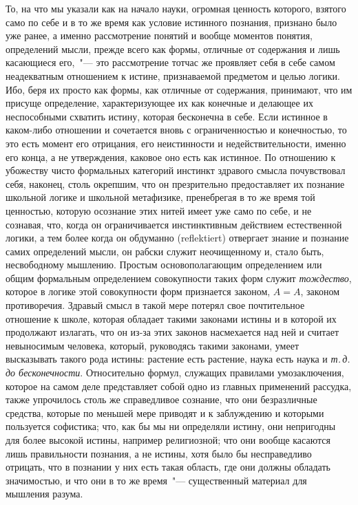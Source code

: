 То, на что мы указали как на начало науки, огромная
ценность которого, взятого само по себе и в то же время
как условие истинного познания, признано было уже ранее,
а именно рассмотрение понятий и вообще моментов
понятия, определений мысли, прежде всего как формы,
отличные от содержания и лишь касающиеся его,~"--- это
рассмотрение тотчас же проявляет себя в себе самом
неадекватным отношением к истине, признаваемой предметом
и целью логики. Ибо, беря их просто как формы,
как отличные от содержания, принимают, что им присуще
определение, характеризующее их как конечные и делающее
их неспособными схватить истину, которая бесконечна
в себе. Если истинное в каком-либо отношении и
сочетается вновь с ограниченностью и конечностью, то
это есть момент его отрицания, его неистинности и недействительности,
именно его конца, а не утверждения, каковое
оно есть как истинное. По отношению к убожеству
чисто формальных категорий инстинкт здравого смысла
почувствовал себя, наконец, столь окрепшим, что он презрительно
предоставляет их познание школьной логике
и школьной метафизике, пренебрегая в то же время той
ценностью, которую осознание этих нитей имеет уже
само по себе, и не сознавая, что, когда он ограничивается
инстинктивным действием естественной логики, а тем
более когда он обдуманно (reflektiert) отвергает знание и
познание самих определений мысли, он рабски служит
неочищенному и, стало быть, несвободному мышлению.
Простым основополагающим определением или общим
формальным определением совокупности таких форм служит
\emph{тождество}, которое в логике этой совокупности форм
признается законом, $A = A$, законом противоречия. Здравый
смысл в такой мере потерял свое почтительное отношение
к школе, которая обладает такими законами истины
и в которой их продолжают излагать, что он из-за
этих законов насмехается над ней и считает невыносимым
человека, который, руководясь такими законами,
умеет высказывать такого рода истины: растение есть
растение, наука есть наука и \emph{т.\,д. до бесконечности}.
Относительно формул, служащих правилами умозаключения,
которое на самом деле представляет собой одно из
главных применений рассудка, также упрочилось столь
же справедливое сознание, что они безразличные средства,
которые по меньшей мере приводят и к заблуждению
и которыми пользуется софистика; что, как бы мы ни
определяли истину, они непригодны для более высокой
истины, например религиозной; что они вообще касаются
лишь правильности познания, а не истины, хотя было бы
несправедливо отрицать, что в познании у них есть такая
область, где они должны обладать значимостью, и что
они в то же время~"--- существенный материал для мышления
разума.

